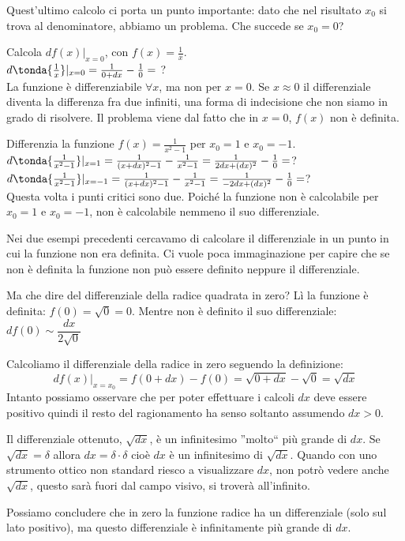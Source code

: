 Quest'ultimo calcolo ci porta un punto importante: dato che nel risultato
$x_0$ si trova al denominatore, abbiamo un problema. Che succede se $x_0=0$?
\begin{esempio}
 Calcola $df(x)|_{x=0}$, con $f(x)=\frac{1}{x}$.\\
 $d\tonda{\frac{1}{x}}|_{x=0}=\frac{1}{0+dx}-\frac{1}{0}=$ ?\\
 La funzione è differenziabile $\forall x$, ma non per $x=0$. Se $x\approx 
0$
 il differenziale diventa la differenza fra due infiniti, una forma di 
 indecisione che non siamo in grado di risolvere. Il problema viene dal 
fatto 
 che in $x=0$, $f(x)$ non è definita.
\end{esempio}

\begin{esempio}
Differenzia la funzione $f(x)=\frac{1}{x^2-1}$ per $x_0=1$ e $x_0=-1$.\\
$d\tonda{\frac{1}{x^2-1}}|_{x=1}=\frac{1}{(x+dx)^2-1}-\frac{1}{x^2-1}=
\frac{1}{2dx+(dx)^2}-\frac{1}{0}=$?\\
$d\tonda{\frac{1}{x^2-1}}|_{x=-1}=\frac{1}{(x+dx)^2-1}-\frac{1}{x^2-1}=
\frac{1}{-2dx+(dx)^2}-\frac{1}{0}=$?\\
Questa volta i punti critici sono due. Poiché la funzione non è calcolabile
per $x_0=1$ e $x_0=-1$, non è calcolabile nemmeno il suo differenziale.
\end{esempio}

\begin{esempio}
Nei due esempi precedenti cercavamo di calcolare il differenziale in un 
punto in cui la funzione non era definita. Ci vuole poca immaginazione per 
capire che se non è definita la funzione non può essere definito neppure il 
differenziale.

Ma che dire del differenziale della radice quadrata in zero? Lì la funzione 
è definita: \(f(0)=\sqrt{0}=0\). 
Mentre non è definito il suo 
differenziale: \(df(0) \sim \dfrac{dx}{2 \sqrt{0}}\)

Calcoliamo il differenziale della radice in zero seguendo la definizione:
\[df(x)|_{x=x_0} = f(0+dx)-f(0)=\sqrt{0+dx}-\sqrt{0}=\sqrt{dx}\]
Intanto possiamo osservare che per poter effettuare i calcoli \(dx\) deve 
essere positivo quindi il resto del ragionamento ha senso soltanto 
assumendo \(dx>0\).

Il differenziale ottenuto, \(\sqrt{dx}\), è un infinitesimo ''molto`` più 
grande di \(dx\). 
Se \(\sqrt{dx} = \delta\) allora \(dx = \delta \cdot \delta\) cioè \(dx\) è 
un infinitesimo di \(\sqrt{dx}\). Quando con uno strumento ottico non 
standard riesco a visualizzare \(dx\), non potrò vedere anche 
\(\sqrt{dx}\), questo sarà fuori dal campo visivo, si troverà all'infinito.

Possiamo concludere che in zero la funzione radice ha un differenziale 
(solo sul lato positivo), ma questo differenziale è infinitamente più 
grande di \(dx\).
\end{esempio}

